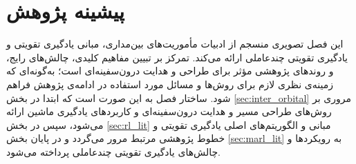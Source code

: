 \chapter{پیشینه پژوهش}
\label{ch:literature}

این فصل تصویری منسجم از ادبیات مأموریت‌های بین‌مداری، مبانی یادگیری تقویتی و یادگیری تقویتی چندعاملی ارائه می‌کند. تمرکز بر تبیین مفاهیم کلیدی، چالش‌های رایج، و روندهای پژوهشی مؤثر برای طراحی و هدایت درون‌سفینه‌ای است؛ به‌گونه‌ای که زمینه‌ی نظری لازم برای روش‌ها و مسائل مورد استفاده در ادامه‌ی پژوهش فراهم شود. ساختار فصل به این صورت است که ابتدا در بخش \ref{sec:inter_orbital} مروری بر روش‌های طراحی مسیر و هدایت درون‌سفینه‌ای و کاربردهای یادگیری ماشین ارائه می‌شود، سپس در بخش \ref{sec:rl_lit} مبانی و الگوریتم‌های اصلی یادگیری تقویتی و خطوط پژوهشی مرتبط مرور می‌گردد و در پایان بخش \ref{sec:marl_lit} به رویکردها و چالش‌های یادگیری تقویتی چندعاملی پرداخته می‌شود.


% 


